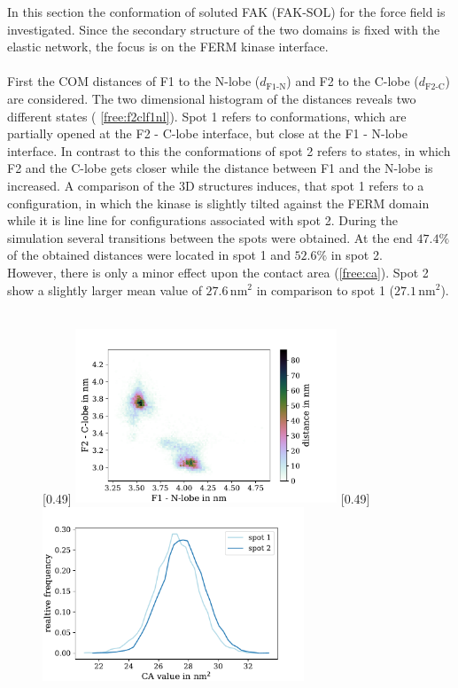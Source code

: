 \label{sec:fak_sol}
In this section the conformation of soluted FAK (FAK-SOL) for the \martini force field is investigated. Since the secondary structure of the two domains is fixed with the elastic network, the focus is on the FERM kinase interface.\\
\\
First the COM distances of F1 to the N-lobe ($d_\text{F1-N}$) and F2 to the C-lobe ($d_\text{F2-C}$) are considered. The two dimensional histogram of the distances reveals two different states ( \autoref{free:f2clf1nl}). Spot 1 refers to conformations, which are partially opened at the F2 - C-lobe interface, but close at the F1 - N-lobe interface. In contrast to this the conformations of spot 2 refers to states, in which F2 and the C-lobe gets closer while the distance between F1 and the N-lobe is increased. A comparison of the 3D structures induces, that spot 1 refers to a configuration, in which the kinase is slightly tilted against the FERM domain while it is line line for configurations associated with spot 2. During the simulation several transitions between the spots were obtained. At the end $47.4\%$ of the obtained distances were located in spot 1 and $52.6\%$ in spot 2.\\
However, there is only a minor effect upon the contact area (\autoref{free:ca}).  Spot 2 show a slightly larger mean value of $27.6\,\si{\nano\metre}^2$ in comparison to spot 1 ($27.1\,\si{\nano\metre}^2$).\\
\\
%
%
%
\begin{figure}
	\subcaptionbox{\label{free:f2clf1nl}}[0.49\textwidth]{
		\includegraphics[height=5.2cm]{figures/results/free_f1f2}
	}\hfill%
	\subcaptionbox{\label{free:ca}}[0.49\textwidth]{
		\includegraphics[height=5.2cm]{figures/results/free_ca}
	}%
\end{figure}
